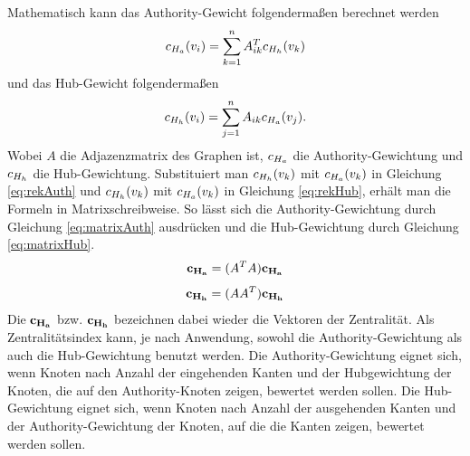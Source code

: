 Mathematisch kann das Authority-Gewicht folgendermaßen berechnet werden
\begin{equation}
c_{H_a}(v_i) = \sum^n_{k=1}A^T_{ik}c_{H_h}(v_k)
\label{eq:rekAuth}
\end{equation}
und das Hub-Gewicht folgendermaßen
\begin{equation}
c_{H_h}(v_i) = \sum^n_{j=1}A_{ik}c_{H_a}(v_j) \text{.}
\label{eq:rekHub}
\end{equation}
Wobei $A$ die Adjazenzmatrix des Graphen ist, $c_{H_a}$ die Authority-Gewichtung und $c_{H_h}$ die Hub-Gewichtung. Substituiert man $c_{H_h}(v_k)$ mit $c_{H_a}(v_k)$ in Gleichung \ref{eq:rekAuth} und $c_{H_h}(v_k)$ mit $c_{H_a}(v_k)$ in Gleichung \ref{eq:rekHub}, erhält man die Formeln in Matrixschreibweise. So lässt sich die Authority-Gewichtung durch Gleichung \ref{eq:matrixAuth} ausdrücken und die Hub-Gewichtung durch Gleichung \ref{eq:matrixHub}. 
\begin{equation}
\mathbf{c_{H_a}} = (A^TA)\mathbf{c_{H_a}}
\label{eq:matrixAuth}
\end{equation}
\begin{equation}
\mathbf{c_{H_h}} = (AA^T)\mathbf{c_{H_h}}
\label{eq:matrixHub}
\end{equation}
Die $\mathbf{c_{H_a}}$ bzw. $\mathbf{c_{H_h}}$ bezeichnen dabei wieder die Vektoren der Zentralität. Als Zentralitätsindex kann, je nach Anwendung, sowohl die Authority-Gewichtung als auch die Hub-Gewichtung benutzt werden. Die Authority-Gewichtung eignet sich, wenn Knoten nach Anzahl der eingehenden Kanten und der Hubgewichtung der Knoten, die auf den Authority-Knoten zeigen, bewertet werden sollen. Die Hub-Gewichtung eignet sich, wenn Knoten nach Anzahl der ausgehenden Kanten und der Authority-Gewichtung der Knoten, auf die die Kanten zeigen, bewertet werden sollen.